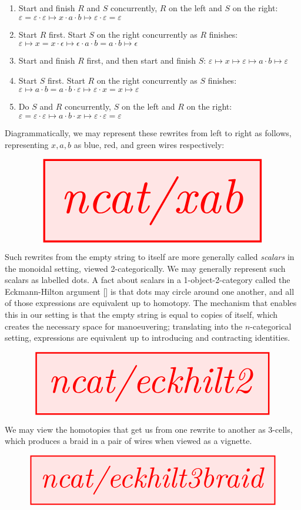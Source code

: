 \begin{enumerate}
\item{Start and finish $R$ and $S$ concurrently, $R$ on the left and $S$ on the right: $\varepsilon = \varepsilon \cdot \varepsilon \mapsto x \cdot a \cdot b \mapsto \varepsilon \cdot \varepsilon = \varepsilon$}
\item{Start $R$ first. Start $S$ on the right concurrently as $R$ finishes: $\varepsilon \mapsto x = x \cdot \epsilon \mapsto \epsilon \cdot a \cdot b = a \cdot b \mapsto \epsilon$}
\item{Start and finish $R$ first, and then start and finish $S$: $\varepsilon \mapsto x \mapsto \varepsilon \mapsto a \cdot b \mapsto \varepsilon$}
\item{Start $S$ first. Start $R$ on the right concurrently as $S$ finishes: $\varepsilon \mapsto a \cdot b = a \cdot b \cdot \varepsilon \mapsto \varepsilon \cdot x = x \mapsto \varepsilon $}
\item{Do $S$ and $R$ concurrently, $S$ on the left and $R$ on the right: $\varepsilon = \varepsilon \cdot \varepsilon \mapsto a \cdot b \cdot x \mapsto \varepsilon \cdot \varepsilon = \varepsilon $}
\end{enumerate}

Diagrammatically, we may represent these rewrites from left to right as follows, representing $x,a,b$ as blue, red, and green wires respectively:

\[\resizebox{\textwidth}{!}{\tikzfig{ncat/xab}}\]

Such rewrites from the empty string to itself are more generally called \emph{scalars} in the monoidal setting, viewed 2-categorically. We may generally represent such scalars as labelled dots. A fact about scalars in a 1-object-2-category called the Eckmann-Hilton argument [] is that dots may circle around one another, and all of those expressions are equivalent up to homotopy. The mechanism that enables this in our setting is that the empty string is equal to copies of itself, which creates the necessary space for manoeuvering; translating into the $n$-categorical setting, expressions are equivalent up to introducing and contracting identities.

\[\resizebox{\textwidth}{!}{\tikzfig{ncat/eckhilt2}}\]

We may view the homotopies that get us from one rewrite to another as 3-cells, which produces a braid in a pair of wires when viewed as a vignette.

\[\resizebox{\textwidth}{!}{\tikzfig{ncat/eckhilt3braid}}\]

